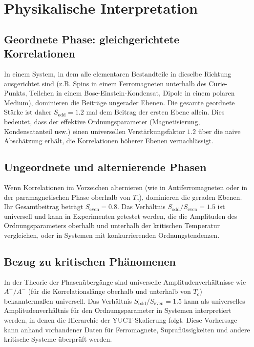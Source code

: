 \documentclass[12pt,a4paper]{article}
\begin{document}
	\section{Physikalische Interpretation}
	
	\subsection{Geordnete Phase: gleichgerichtete Korrelationen}
	In einem System, in dem alle elementaren Bestandteile in dieselbe Richtung ausgerichtet sind (z.B. Spins in einem Ferromagneten unterhalb des Curie-Punkts, Teilchen in einem Bose-Einstein-Kondensat, Dipole in einem polaren Medium), dominieren die Beiträge ungerader Ebenen. Die gesamte geordnete Stärke ist daher \(S_{\text{odd}} = 1.2\) mal dem Beitrag der ersten Ebene allein. Dies bedeutet, dass der effektive Ordnungsparameter (Magnetisierung, Kondensatanteil usw.) einen universellen Verstärkungsfaktor \(1.2\) über die naive Abschätzung erhält, die Korrelationen höherer Ebenen vernachlässigt.
	
	\subsection{Ungeordnete und alternierende Phasen}
	Wenn Korrelationen im Vorzeichen alternieren (wie in Antiferromagneten oder in der paramagnetischen Phase oberhalb von \(T_c\)), dominieren die geraden Ebenen. Ihr Gesamtbeitrag beträgt \(S_{\text{even}} = 0.8\). Das Verhältnis \(S_{\text{odd}}/S_{\text{even}} = 1.5\) ist universell und kann in Experimenten getestet werden, die die Amplituden des Ordnungsparameters oberhalb und unterhalb der kritischen Temperatur vergleichen, oder in Systemen mit konkurrierenden Ordnungstendenzen.
	
	\subsection{Bezug zu kritischen Phänomenen}
	In der Theorie der Phasenübergänge sind universelle Amplitudenverhältnisse wie \(A^+/A^-\) (für die Korrelationslänge oberhalb und unterhalb von \(T_c\)) bekanntermaßen universell. Das Verhältnis \(S_{\text{odd}}/S_{\text{even}} = 1.5\) kann als universelles Amplitudenverhältnis für den Ordnungsparameter in Systemen interpretiert werden, in denen die Hierarchie der YUCT-Skalierung folgt. Diese Vorhersage kann anhand vorhandener Daten für Ferromagnete, Supraflüssigkeiten und andere kritische Systeme überprüft werden.
	
\end{document}

